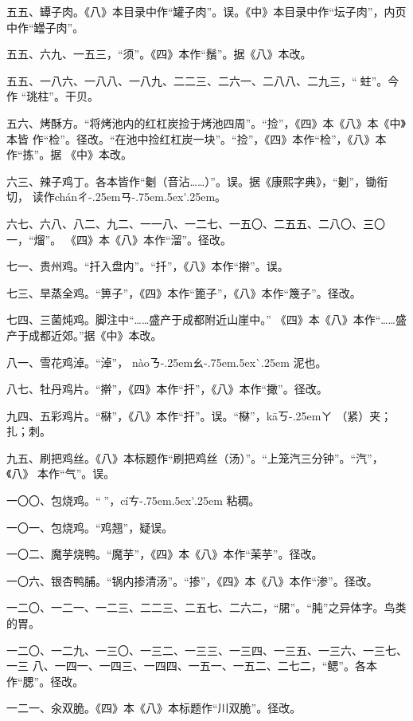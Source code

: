 \begin{list}{}
五五、罈子肉。《八》本目录中作“罐子肉”。误。《中》本目录中作“坛子肉”，内页
中作“罎子肉”。

五五、六九、一五三，“须”。《四》本作“鬚”。据《八》本改。

五五、一八六、一八八、一八九、二二三、二六一、二八八、二九三，“𧎼蛀”。今作
“珧柱”。干贝。

五六、烤酥方。“将烤池内的红杠炭捡于烤池四周”。“捡”，《四》本《八》本《中》本皆
作“检”。径改。“在池中捡红杠炭一块”。“捡”，《四》本作“检”，《八》本作“拣”。据
《中》本改。

六三、辣子鸡丁。各本皆作“劖（音沾……）”。误。据《康熙字典》，“劖”，锄衔切，
读作{ch\'{a}n}{ㄔ\kern-.25emㄢ\kern-.75em\raise.5ex\hbox{\'{}}\kern.25em}。

六七、六八、八二、九二、一一八、一二七、一五〇、二五五、二八〇、三〇一，“熘”。
《四》本《八》本作“溜”。径改。

七一、贵州鸡。“扦入盘内”。“扦”，《八》本作“擀”。误。

七三、旱蒸全鸡。“箅子”，《四》本作“篦子”，《八》本作“篾子”。径改。

七四、三菌炖鸡。脚注{\footnotesize{}}中“……盛产于成都附近山崖中。”
《四》本《八》本作“……盛产于成都近郊。”据《中》本改。

八一、雪花鸡淖。“淖”，
{n\`{a}o}{ㄋ\kern-.25emㄠ\kern-.75em\raise.5ex\hbox{\`{}}\kern.25em} 泥也。

八七、牡丹鸡片。“擀”，《四》本作“扞”，《八》本作“撖”。径改。

九四、五彩鸡片。“㮟”，《八》本作“扞”。误。“㮟”，{k\={a}}{ㄎ\kern-.25emㄚ}
（紧）夹；扎；刺。

九五、刷把鸡丝。《八》本标题作“刷把鸡丝（汤）”。“上笼汽三分钟”。“汽”，《八》
本作“气”。误。

一〇〇、包烧鸡。“𫃕”，{c\'{i}}{ㄘ\kern-.75em\raise.5ex\hbox{\'{}}\kern.25em}
粘稠。

一〇一、包烧鸡。“鸡翘”，疑误。

一〇二、魔芋烧鸭。“魔芋”，《四》本《八》本作“茉芋”。径改。

一〇六、银杏鸭脯。“锅内掺清汤”。“掺”，《四》本《八》本作“渗”。径改。

一二〇、一二一、一二三、二二三、二五七、二六二，“𬂁”。“肫”之异体字。鸟类的胃。

一二〇、一二九、一三〇、一三二、一三三、一三四、一三五、一三六、一三七、一三
八、一四一、一四三、一四四、一五一、一五二、二七二，“鳃”。各本作“腮”。径改。

一二一、汆双脆。《四》本《八》本标题作“川双脆”。径改。


\end{list}
